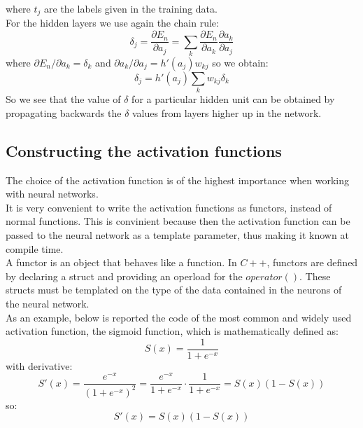 \documentclass[12pt]{article}
\begin{document}
where $t_j$ are the labels given in the training data. \\
For the hidden layers we use again the chain rule:
\begin{equation}
  \delta_j = \frac{\partial E_n}{\partial a_j}
  = \sum_k \frac{\partial E_n}{\partial a_k}\frac{\partial a_k}{\partial a_j}
  \label{hidden_layers_delta}
\end{equation}
where $\partial E_n / \partial a_k = \delta_k$ and $\partial a_k / \partial a_j = h'(a_j)w_{kj}$
so we obtain:
\begin{equation}
  \delta_j = h'(a_j)\sum_k w_{kj}\delta_k
  \label{simplified_hidden_layer_delta}
\end{equation}
So we see that the value of $\delta$ for a particular hidden unit can be obtained by propagating backwards 
the $\delta$ values from layers higher up in the network.

\subsection{Constructing the activation functions}
The choice of the activation function is of the highest importance when working with neural networks. \\
It is very convenient to write the activation functions as functors, instead of normal functions. This is
convinient because then the activation function can be passed to the neural network as a template parameter,
thus making it known at compile time. \\
A functor is an object that behaves like a function. In $C++$, functors are defined by declaring a struct 
and providing an operload for the $operator()$. These structs must be templated on the type of the data
contained in the neurons of the neural network. \\
As an example, below is reported the code of the most common and widely used activation function, the sigmoid
function, which is mathematically defined as:
\begin{equation}
  S(x) = \frac{1}{1 + e^{-x}}
\end{equation}
with derivative:
$$
  S'(x) = \frac{e^{-x}}{(1 + e^{-x})^2} = \frac{e^{-x}}{1 + e^{-x}}\cdot\frac{1}{1 + e^{-x}} 
  = S(x)\left(1 - S(x)\right)
$$
so:
\begin{equation}
  S'(x) = S(x)\left(1 - S(x)\right)
\end{equation}


\end{document}
